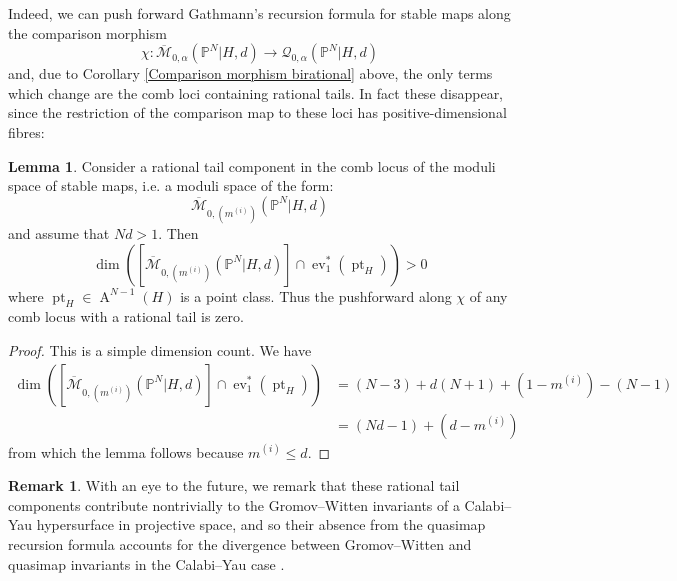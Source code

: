 \documentclass[11pt]{amsart}
\newcommand{\M}[4]{\overline{\mathcal{M}}_{#1,#2}(#3,#4)}
\newcommand{\Q}[4]{\mathcal{Q}_{#1,#2}(#3,#4)}
\newcommand{\PP}{\mathbb P}
\renewcommand{\to}{\rightarrow}
\newcommand{\comp}{\chi}
\newcommand{\Achow}{\operatorname{A}}
\newcommand{\pt}{\operatorname{pt}}
\newcommand{\ev}{\operatorname{ev}}
\theoremstyle{definition}
\newtheorem{lem}[thm]{Lemma}
\theoremstyle{definition}
\newtheorem{remark}[thm]{Remark}
\begin{document}
Indeed, we can push forward Gathmann's recursion formula for stable maps along the comparison morphism
\begin{equation*} \comp \colon \M{0}{\alpha}{\PP^N|H}{d}\to\Q{0}{\alpha}{\PP^N|H}{d} \end{equation*}
and, due to Corollary \ref{Comparison morphism birational} above, the only terms which change are the comb loci containing rational tails. In fact these disappear, since the restriction of the comparison map to these loci has positive-dimensional fibres:
\begin{lem}\label{lem:posdimfiber} Consider a rational tail component in the comb locus of the moduli space of stable maps, i.e. a moduli space of the form:
\begin{equation*} \M{0}{(m^{(i)})}{\PP^N|H}{d} \end{equation*}
and assume that $Nd>1$.  Then
\begin{equation*} \dim \left( [\M{0}{(m^{(i)})}{\PP^N|H}{d}] \cap \ev_1^*(\pt_H) \right) > 0 \end{equation*}
where $\pt_H \in \Achow^{N-1}(H)$ is a point class. Thus the pushforward along $\comp$ of any comb locus with a rational tail is zero.
\end{lem}
\begin{proof} This is a simple dimension count. We have
\begin{align*} \dim \left( [\M{0}{(m^{(i)})}{\PP^N|H}{d}] \cap \ev_1^*(\pt_H) \right) & =(N-3)+d(N+1)+(1-m^{(i)})-(N-1) \\
& =(Nd-1)+(d-m^{(i)})
\end{align*}
from which the lemma follows because $m^{(i)} \leq d$.
\end{proof}
\begin{remark} With an eye to the future, we remark that these rational tail components contribute nontrivially to the Gromov--Witten invariants of a Calabi--Yau hypersurface in projective space, and so their absence from the quasimap recursion formula accounts for the divergence between Gromov--Witten and quasimap invariants in the Calabi--Yau case \cite[Rmk. 1.6]{Ga-MF}. \end{remark}
\end{document}
